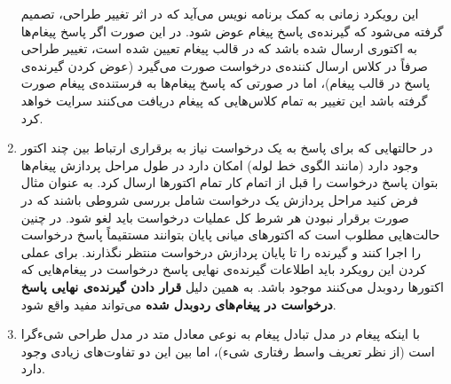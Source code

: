 \begin{enumerate}
این رویکرد زمانی به کمک برنامه نویس می‌آید که در اثر تغییر طراحی، تصمیم گرفته می‌شود که گیرنده‌ی پاسخ پیغام عوض شود. در این صورت اگر پاسخ پیغام‌ها به اکتوری ارسال شده باشد که در قالب پیغام تعیین شده است، تغییر طراحی صرفاً در کلاس ارسال کننده‌ی درخواست صورت می‌گیرد (عوض کردن گیرنده‌ی پاسخ در قالب پیغام)، اما در صورتی که پاسخ پیغام‌ها به فرستنده‌ی پیغام صورت گرفته باشد این تغییر به تمام کلاس‌هایی که پیغام دریافت می‌کنند سرایت خواهد کرد.
\item در حالتهایی که برای پاسخ به یک درخواست نیاز به برقراری ارتباط بین چند اکتور وجود دارد (مانند الگوی خط لوله) امکان دارد در طول مراحل پردازش پیغام‌ها بتوان پاسخ درخواست را قبل از اتمام کار تمام اکتورها ارسال کرد. به عنوان مثال فرض کنید مراحل پردازش یک درخواست شامل بررسی شروطی باشند که در صورت برقرار نبودن هر شرط کل عملیات درخواست باید لغو شود. در چنین حالت‌هایی مطلوب است که اکتورهای میانی پایان بتوانند مستقیماً پاسخ درخواست را اجرا کنند و گیرنده را تا پایان پردازش درخواست منتظر نگذارند. برای عملی کردن این رویکرد باید اطلاعات گیرنده‌ی نهایی پاسخ درخواست در پیغام‌هایی که اکتورها ردوبدل می‌کنند موجود باشد. به همین دلیل \textbf{قرار دادن گیرنده‌ی نهایی پاسخ درخواست در پیغام‌های ردوبدل شده} می‌تواند مفید واقع شود.
\item با اینکه پیغام در مدل تبادل پیغام به نوعی معادل متد در مدل طراحی شیءگرا است (از نظر تعریف واسط رفتاری شیء)، اما بین این دو تفاوت‌های زیادی وجود دارد.
\end{enumerate}

